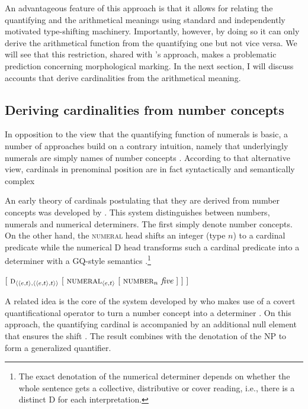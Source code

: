 \documentclass[output=paper]{langscibook}
\begin{document}
\noindent An advantageous feature of this approach is that it allows for relating the quantifying and the arithmetical meanings using standard and independently motivated type-shifting machinery. Importantly, however, by doing so it can only derive the arithmetical function from the quantifying one but not vice versa. We will see that this restriction, shared with \citeauthor{ionin_matushansky2018cardinals}'s approach, makes a problematic prediction concerning morphological marking. In the next section, I will discuss accounts that derive cardinalities from the arithmetical meaning. 
	
	\subsection{Deriving cardinalities from number concepts}\label{sec:deriving-cardinalities-from-number-concepts}

    In opposition to the view that the quantifying function of numerals is basic, a number of approaches build on a contrary intuition, namely that underlyingly numerals are simply names of number concepts \citep[e.g.,][]{scha1981distributive,Krifka1989,scontras2014semantics,wagiel2018subatomic}. According to that alternative view, cardinals in prenominal position are in fact syntactically and semantically complex 

An early theory of cardinals postulating that they are derived from number concepts was developed by \citet{scha1981distributive}. This system distinguishes between numbers, numerals and numerical determiners. The first simply denote number concepts. On the other hand, the \textsc{numeral} head shifts an integer (type $n$) to a cardinal predicate while the numerical D head transforms such a cardinal predicate into a determiner with a GQ-style semantics .\footnote{The exact denotation of the numerical determiner depends on whether the whole sentence gets a collective, distributive or cover reading, i.e., there is a distinct D for each interpretation.}

\ea $[\ \textsc{d}_{\langle\langle e,t\rangle,\langle\langle e,t\rangle,t\rangle\rangle}\ [\ \textsc{numeral}_{\langle e,t\rangle}\ [\ \textsc{number}_n\ \textit{five}\ ]\ ]\ ]$\label{ex:d-numeral-number}
\z

\noindent A related idea is the core of the system developed by \citet{hackl2000comparative} who makes use of a covert quantificational operator  to turn a number concept into a determiner . On this approach, the quantifying cardinal is accompanied by an additional null element that ensures the shift . The result combines with the denotation of the NP to form a generalized quantifier.
\end{document}
